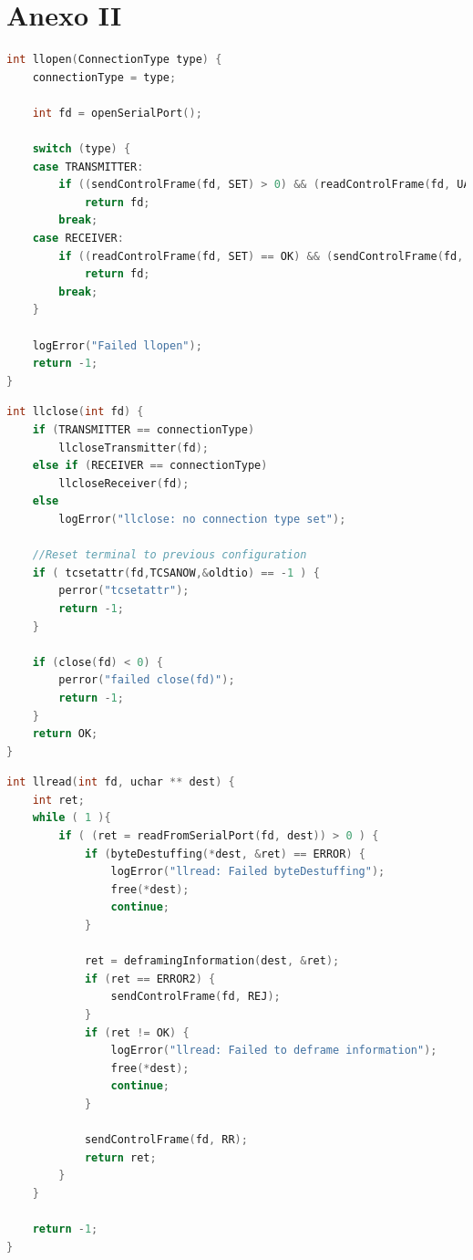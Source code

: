 \documentclass[a4paper, 11pt]{article}
\begin{document}
\newpage

\section{Anexo II}

\begin{lstlisting}[caption = llopen, language=C]
int llopen(ConnectionType type) {
	connectionType = type;

	int fd = openSerialPort();

	switch (type) {
	case TRANSMITTER:
		if ((sendControlFrame(fd, SET) > 0) && (readControlFrame(fd, UA) == OK))
			return fd;
		break;
	case RECEIVER:
		if ((readControlFrame(fd, SET) == OK) && (sendControlFrame(fd, UA) > 0))
			return fd;
		break;
	}

	logError("Failed llopen");
	return -1;
}
\end{lstlisting}


\begin{lstlisting}[caption = llclose, language=C]
int llclose(int fd) {
	if (TRANSMITTER == connectionType)
		llcloseTransmitter(fd);
	else if (RECEIVER == connectionType)
		llcloseReceiver(fd);
	else
		logError("llclose: no connection type set");

	//Reset terminal to previous configuration
	if ( tcsetattr(fd,TCSANOW,&oldtio) == -1 ) {
		perror("tcsetattr");
		return -1;
	}

	if (close(fd) < 0) {
		perror("failed close(fd)");
		return -1;
	}
	return OK;
}
\end{lstlisting}

\begin{lstlisting}[caption = llread, language=C]
int llread(int fd, uchar ** dest) {
	int ret;
	while ( 1 ){
		if ( (ret = readFromSerialPort(fd, dest)) > 0 ) {
			if (byteDestuffing(*dest, &ret) == ERROR) {
				logError("llread: Failed byteDestuffing");
				free(*dest);
				continue;
			}

			ret = deframingInformation(dest, &ret);
			if (ret == ERROR2) {
				sendControlFrame(fd, REJ);
			}
			if (ret != OK) {
				logError("llread: Failed to deframe information");
				free(*dest);
				continue;
			}

			sendControlFrame(fd, RR);
			return ret;
		}
	}
	
	return -1;
}
\end{lstlisting}
\end{document}
